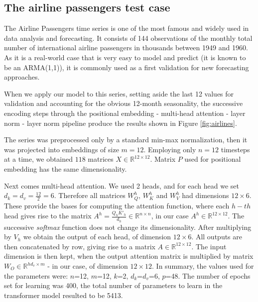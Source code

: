 \documentclass[algorithms,article,submit,pdftex,moreauthors]{Definitions/mdpi}
\begin{document}
\subsection{The airline passengers test case} \label{subsec:airlines}

The Airline Passengers time series is one of the most famous and widely used in data analysis and forecasting. It consists of 144 observations of the monthly total number of international airline passengers in thousands between 1949 and 1960. As it is a real-world case that is very easy to model and predict (it is known to be an ARMA(1,1)), it is commonly used as a first validation for new forecasting approaches.

When we apply our model to this series, setting aside the last 12 values for validation and accounting for the obvious 12-month seasonality, the successive encoding steps through the positional embedding - multi-head attention - layer norm - layer norm pipeline produce the results shown in Figure \ref{fig:airlines}.

The series was preprocessed only by a standard min-max normalization, then it was projected into embeddings of size $m = 12$. Employing only $n = 12$ timesteps at a time, we obtained $118$ matrices $X \in \mathbb{R}^{12 \times 12}$. Matrix $P$ used for positional embedding has the same dimensionality.

Next comes multi-head attention. We used 2 heads, and for each head we set $d_k = d_v = \frac{12}{2} = 6$. Therefore all matrices $W^h_Q$, $W^h_K$ and $W^h_V$ had dimensions $12 \times 6$. These provide the bases for computing the attention function, where each $h-th$ head gives rise to the matrix $A^h=\frac{Q_hK'_h}{d_h} \in \mathbb{R}^{n \times n}$, in our case $A^h \in \mathbb{R}^{12 \times 12}$. The successive {\em softmax} function does not change its dimensionality. After multiplying by $V_h$ we obtain the output of each head, of dimension $12 \times 6$. All outputs are then concatenated by row, giving rise to a matrix $A \in \mathbb{R}^{12 \times 12}$. The input dimension is then kept, when the output attention matrix is multiplied by matrix $W_O \in \mathbb{R}^{hd_v \times m}$ - in our case, of dimension $12 \times 12$. In summary, the values used for the parameters were: $n$=12, $m$=12, $k$=2,  $d_k$=$d_v$=6, $p$=48. The number of epochs set for learning was 400, the total number of parameters to learn in the transformer model resulted to be 5413.
\end{document}
